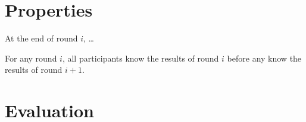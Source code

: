   \section{Properties}
  \begin{theorem} At the end of round $i$, \ldots {}\end{theorem}
  \begin{theorem} For any round $i$, all participants know the results of round
    $i$ before any know the results of round
    $i+1$.\end{theorem}\label{theorem:rounds}
  \section{Evaluation}

